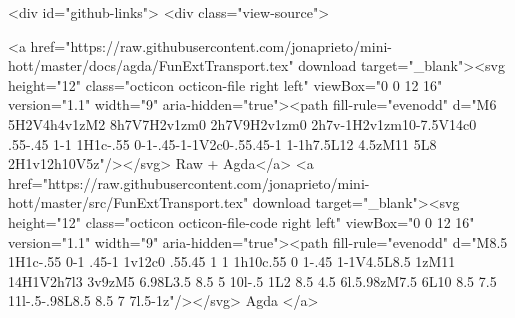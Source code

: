   <div id="github-links">
    <div class="view-source">
      
        <a href="https://raw.githubusercontent.com/jonaprieto/mini-hott/master/docs/agda/FunExtTransport.tex" download target="_blank"><svg height="12" class="octicon octicon-file right left" viewBox="0 0 12 16" version="1.1" width="9" aria-hidden="true"><path fill-rule="evenodd" d="M6 5H2V4h4v1zM2 8h7V7H2v1zm0 2h7V9H2v1zm0 2h7v-1H2v1zm10-7.5V14c0 .55-.45 1-1 1H1c-.55 0-1-.45-1-1V2c0-.55.45-1 1-1h7.5L12 4.5zM11 5L8 2H1v12h10V5z"/></svg> Raw + Agda</a>
        <a href="https://raw.githubusercontent.com/jonaprieto/mini-hott/master/src/FunExtTransport.tex" download target="_blank"><svg height="12" class="octicon octicon-file-code right left" viewBox="0 0 12 16" version="1.1" width="9" aria-hidden="true"><path fill-rule="evenodd" d="M8.5 1H1c-.55 0-1 .45-1 1v12c0 .55.45 1 1 1h10c.55 0 1-.45 1-1V4.5L8.5 1zM11 14H1V2h7l3 3v9zM5 6.98L3.5 8.5 5 10l-.5 1L2 8.5 4.5 6l.5.98zM7.5 6L10 8.5 7.5 11l-.5-.98L8.5 8.5 7 7l.5-1z"/></svg> Agda </a>
      
